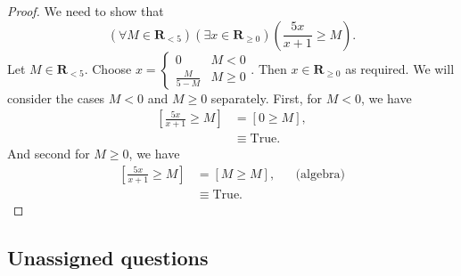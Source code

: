 \documentclass[12pt,fleqn,answers]{exam}
\newcommand{\reals}{\mathbf{R}}
\newcommand{\true}{\mathrm{True}}
\renewenvironment{solution}
  {\begin{shaded*}} %
  {\end{shaded*}}   %
\begin{document}
\begin{questions}
\begin{solution}
\begin{proof} We need to show that 
  \begin{equation*}
    \left(\forall M \in  \reals_{< 5} \right)
    \left(\exists x \in  \reals_{\geq 0} \right) 
    \left(\frac{5 x}{x+1} \geq   M \right).
    \end{equation*}
    Let $M \in \reals_{< 5}$. Choose 
  $x = \begin{cases}  0 & M < 0 \\
                      \frac{M}{5-M} & M \geq 0 
  \end{cases}$. Then $x \in \reals_{\geq 0}$ as required.
  We will consider the cases $M < 0$ and $M \geq 0$ separately.
  First, for $M < 0$, we have
  \begin{align*}
    \left[ \frac{5 x}{x+1}  \geq  M \right] &= \left[0 \geq  M \right], \\
                                            &\equiv \true.
  \end{align*}
  And second for $M \geq 0$, we have
  \begin{align*}
    \left[ \frac{5 x}{x+1}  \geq  M \right] 
       &= \left[M \geq  M \right], &&\text{(algebra)} \\
      &\equiv \true.
  \end{align*}


\end{proof}
  
\end{solution}
 
\end{questions}

\subsection*{Unassigned questions}
\end{document}
